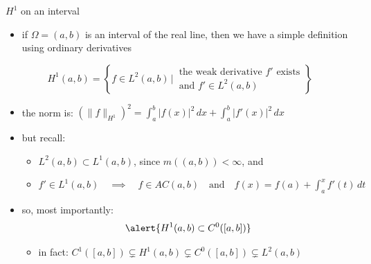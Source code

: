 \documentclass[10pt,
               svgnames,
               hyperref={colorlinks,
                         citecolor=DeepPink4,
                         linkcolor=FireBrick,
                         urlcolor=blue},
               usepdftitle=false]{beamer}
\newcommand{\ds}{\displaystyle}
\begin{document}
\begin{frame}{$H^1$ on an interval}

\begin{itemize}
\item if $\Omega=(a,b)$ is an interval of the real line, then we have \alert{a simple definition using ordinary derivatives}
\end{itemize}

\begin{definition}
    $$H^1(a,b) = \left\{f\in L^2(a,b) \,\Big|\, \begin{matrix}  \text{the weak derivative } f' \text{ exists} \\ \text{and } f' \in L^2(a,b) \end{matrix} \right\}$$
\end{definition}

\begin{itemize}
\item the norm is: \quad $\ds \left(\|f\|_{H^1}\right)^2 = \int_a^b |f(x)|^2 \, dx + \int_a^b |f'(x)|^2\,dx$
\item but recall:
    \begin{itemize}
    \item[$\circ$] $L^2(a,b) \subset L^1(a,b)$, since $m((a,b))<\infty$, and
    \item[$\circ$] $\ds f' \in L^1(a,b) \quad \implies \quad f \in AC(a,b) \quad \text{and}  \quad f(x) = f(a) + \int_a^x f'(t)\,dt$
    \end{itemize}
\item so, most importantly:
	$$\alert{H^1(a,b) \subset C^0([a,b])}$$

    \begin{itemize}
    \item[$\circ$] in fact: \quad $C^1([a,b]) \subsetneq H^1(a,b) \subsetneq C^0([a,b]) \subsetneq L^2(a,b)$
    \end{itemize}
\end{itemize}
\end{frame}
\end{document}
